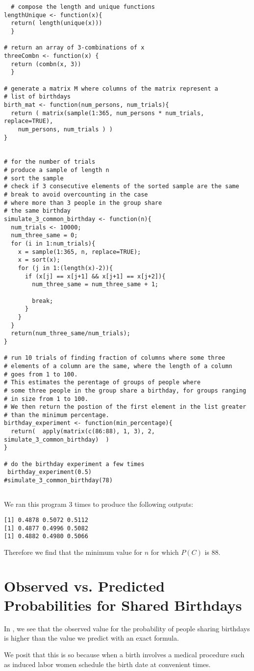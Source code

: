 \documentclass[a4paper,11pt]{article}
\begin{document}
\begin{lstlisting}
  # compose the length and unique functions
lengthUnique <- function(x){
  return( length(unique(x)))
  }

# return an array of 3-combinations of x
threeCombn <- function(x) { 
  return (combn(x, 3))
  }

# generate a matrix M where columns of the matrix represent a
# list of birthdays
birth_mat <- function(num_persons, num_trials){
  return ( matrix(sample(1:365, num_persons * num_trials, replace=TRUE), 
    num_persons, num_trials ) )
}


# for the number of trials
# produce a sample of length n
# sort the sample
# check if 3 consecutive elements of the sorted sample are the same
# break to avoid overcounting in the case
# where more than 3 people in the group share
# the same birthday
simulate_3_common_birthday <- function(n){
  num_trials <- 10000;
  num_three_same = 0;
  for (i in 1:num_trials){
    x = sample(1:365, n, replace=TRUE);
    x = sort(x);
    for (j in 1:(length(x)-2)){
      if (x[j] == x[j+1] && x[j+1] == x[j+2]){
        num_three_same = num_three_same + 1;
        
        break;
      }
    }
  }
  return(num_three_same/num_trials);
}

# run 10 trials of finding fraction of columns where some three
# elements of a column are the same, where the length of a column
# goes from 1 to 100.
# This estimates the perentage of groups of people where 
# some three people in the group share a birthday, for groups ranging
# in size from 1 to 100.
# We then return the postion of the first element in the list greater 
# than the minimum percentage.
birthday_experiment <- function(min_percentage){
  return(  apply(matrix(c(86:88), 1, 3), 2, simulate_3_common_birthday)  )
}

# do the birthday experiment a few times
 birthday_experiment(0.5)
#simulate_3_common_birthday(78)


\end{lstlisting}

We ran this program 3 times to produce the following outputs:

\begin{lstlisting}
[1] 0.4878 0.5072 0.5112
[1] 0.4877 0.4996 0.5082
[1] 0.4882 0.4980 0.5066
\end{lstlisting}

Therefore we find that the minimum value for $n$ for which
$P\left( C \right)$ is $88$.
\printbibliography{}

\section{Observed vs. Predicted Probabilities for Shared Birthdays}

In \cite{mulliganBDayData}, we see that the observed value for the
probability of people sharing birthdays is higher than the value
we predict with an exact formula.

We posit that this is so because when a birth involves a medical 
procedure such as induced labor women schedule the birth date at 
convenient times.
\end{document}
